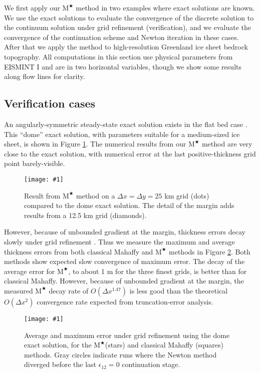 \documentclass[review,letterpaper]{igs}
\newcommand{\onecol}[1]{\texttt{[image: \#1]}}
\newcommand\eps{\epsilon}
\newcommand{\Mstar}{$\text{M}^{\bigstar}$\xspace}
\begin{document}
We first apply our \Mstar method in two examples where exact solutions are known.  We use the exact solutions to evaluate the convergence of the discrete solution to the continuum solution under grid refinement (verification), and we evaluate the convergence of the continuation scheme and Newton iteration in these cases.  After that we apply the method to high-resolution Greenland ice sheet bedrock topography.  All computations in this section use physical parameters from EISMINT I \citep{Huybrechtsetal1996} and are in two horizontal variables, though we show some results along flow lines for clarity.

\subsection{Verification cases}

An angularly-symmetric steady-state exact solution exists in the flat bed case \citep{Bueler2003,vanderVeen2013}.  This ``dome'' exact solution, with parameters suitable for a medium-sized ice sheet, is shown in Figure \ref{fig:domeprofile}.  The numerical results from our \Mstar method are very close to the exact solution, with numerical error at the last positive-thickness grid point barely-visible.

\begin{figure}[ht]
\onecol{domeprofile.pdf}
\caption{Result from \Mstar method on a $\Delta x=\Delta y=25$ km grid (dots) compared to the dome exact solution.  The detail of the margin adds results from a 12.5 km grid  (diamonds).}
\label{fig:domeprofile}
\end{figure}

However, because of unbounded gradient at the margin, thickness errors decay slowly under grid refinement \citep{Bueleretal2005}.  Thus we measure the maximum and average thickness errors from both classical Mahaffy and \Mstar methods in Figure \ref{fig:domeverif}.  Both methods show expected slow convergence of maximum error.  The decay of the average error for \Mstar, to about 1 m for the three finest grids, is better than for classical Mahaffy.  However, because of unbounded gradient at the margin, the measured \Mstar decay rate of $O(\Delta x^{1.47})$ is less good than the theoretical $O(\Delta x^2)$ convergence rate expected from truncation-error analysis.

\begin{figure}[ht]
\onecol{domeverif.pdf}
\caption{Average and maximum error under grid refinement using the dome exact solution, for the \Mstar (stars) and classical Mahaffy (squares) methods.  Gray circles indicate runs where the Newton method diverged before the last $\eps_{12}=0$ continuation stage.}
\label{fig:domeverif}
\end{figure}
\end{document}
